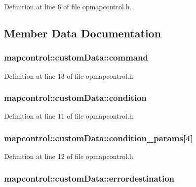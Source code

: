 Definition at line 6 of file opmapcontrol.\-h.



\subsection{Member Data Documentation}
\hypertarget{structmapcontrol_1_1custom_data_a45873bfe2b453babcb46de68a336b514}{
\subsubsection[{command}]{ mapcontrol\-::custom\-Data\-::command}}\label{structmapcontrol_1_1custom_data_a45873bfe2b453babcb46de68a336b514}


Definition at line 13 of file opmapcontrol.\-h.

\hypertarget{structmapcontrol_1_1custom_data_a4bc59f4c1c8b0d292c6544d656ccd74a}{
\subsubsection[{condition}]{ mapcontrol\-::custom\-Data\-::condition}}\label{structmapcontrol_1_1custom_data_a4bc59f4c1c8b0d292c6544d656ccd74a}


Definition at line 11 of file opmapcontrol.\-h.

\hypertarget{structmapcontrol_1_1custom_data_a9b6c6f2c6385e568668e7d821fcb5da7}{
\subsubsection[{condition\-\_\-params}]{ mapcontrol\-::custom\-Data\-::condition\-\_\-params\mbox{[}4\mbox{]}}}\label{structmapcontrol_1_1custom_data_a9b6c6f2c6385e568668e7d821fcb5da7}


Definition at line 12 of file opmapcontrol.\-h.

\hypertarget{structmapcontrol_1_1custom_data_a065cac348b1f88fe39b41fd1d0f6fad4}{
\subsubsection[{errordestination}]{ mapcontrol\-::custom\-Data\-::errordestination}}\label{structmapcontrol_1_1custom_data_a065cac348b1f88fe39b41fd1d0f6fad4}


